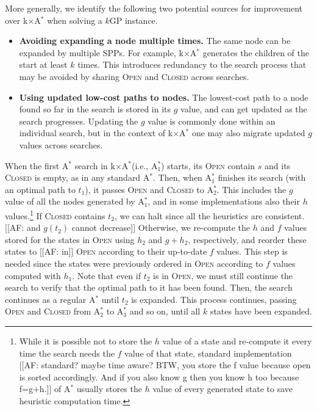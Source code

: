 \documentclass[twoside,11pt]{article}
\newcommand{\kgs}{$k$GP\xspace}
\newcommand{\astar}{A$^*$\xspace}
\newcommand{\kxastar}{k$\times$A$^*$\xspace}
\newcommand{\astari}[1]{A$^*_#1$\xspace}
\newcommand{\open}{\textsc{Open}\xspace}
\newcommand{\closed}{\textsc{Closed}\xspace}
\begin{document}
More generally, we identify the following two potential sources for improvement over \kxastar when solving a \kgs instance. 
\begin{itemize}
\item \textbf{Avoiding expanding a node multiple times.}
  The same node can be expanded by multiple \acp{SPP}.
  For example, \kxastar generates the children of the start at least $k$ times.
  This introduces redundancy to the search process that may be avoided by sharing \open and \closed across searches. 
  
\item \textbf{Using updated low-cost paths to nodes.}
  The lowest-cost path to a node found so far in the search is stored in its $g$ value, and can get updated as the search progresses. Updating the $g$ value is commonly done within an individual search, but in the context of \kxastar{} one may also migrate updated $g$ values across searches.
\end{itemize}




When the first \astar search in \kxastar (i.e., \astari{1}) starts, its \open contain $s$ and its \closed is empty, as in any standard \astar.
Then, when \astari{1} finishes its search (with an optimal path to $t_1$), it passes \open and \closed to \astari{2}.
This includes the $g$ value of all the nodes generated by \astari{1}, and in some implementations also their $h$ values.\footnote{While it is possible not to store the $h$ value of a state and re-compute it every time the search needs the $f$ value of that state, standard implementation [[AF: standard? maybe time aware? BTW, you store the f value because open is sorted accordingly. And if you also know g then you know h too because f=g+h.]] of \astar usually stores the $h$ value of every generated state to save heuristic computation time.} 
If \closed contains $t_2$, we can halt since all the heuristics are consistent.[[AF: and $g(t_2)$ cannot decrease]]
Otherwise, we re-compute the $h$ and $f$ values stored for the states in \open using $h_2$ and $g+h_2$, respectively, and reorder these states to [[AF: in]] \open according to their up-to-date $f$ values.
This step is needed since the states were previously ordered in \open according to $f$ values computed with $h_1$.
Note that even if $t_2$ is in \open, we must still continue the search to verify that the optimal path to it has been found.
Then, the search continues as a regular \astar until $t_2$ is expanded.
This process continues, passing \open and \closed from \astari{2} to \astari{3} and so on, until all $k$ states have been expanded.
\end{document}
